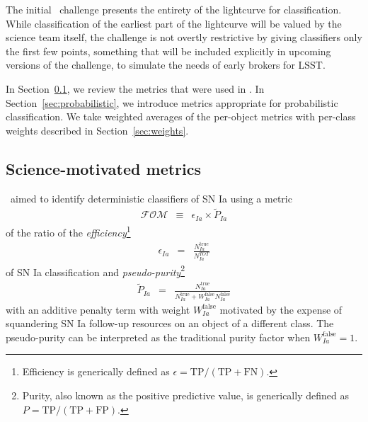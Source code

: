 The initial \plasticc\ challenge presents the entirety of the lightcurve for classification. While classification of the earliest part of the lightcurve will be valued by the science team itself, the challenge is not overtly restrictive by giving classifiers only the first few points, something that will be included explicitly in upcoming versions of the challenge, to simulate the needs of early brokers for LSST.


In Section~\ref{sec:science}, we review the metrics that were used in \snphotcc.
In Section~\ref{sec:probabilistic}, we introduce metrics appropriate for probabilistic classification.
We take weighted averages of the per-object metrics with per-class weights described in Section~\ref{sec:weights}.

\subsection{Science-motivated metrics}
\label{sec:science}


\snphotcc\ aimed to identify deterministic classifiers of SN Ia using a metric
\begin{eqnarray}
  \label{eq:snphotccfom}
  \mathcal{FOM} &\equiv& \epsilon_{Ia} \times \tilde{P}_{Ia}
\end{eqnarray}
of the ratio of the \textit{efficiency}\footnote{Efficiency is generically defined as $\epsilon = \mathrm{TP} / (\mathrm{TP} + \mathrm{FN})$.}
\begin{eqnarray}
  \label{eq:efficiency}
  \epsilon_{Ia} &=& \frac{N_{Ia}^{\mathrm{true}}}{N_{Ia}^{TOT}}
\end{eqnarray}
of SN Ia classification and \textit{pseudo-purity}\footnote{Purity, also known as the positive predictive value, is generically defined as $P = \mathrm{TP} / (\mathrm{TP} + \mathrm{FP})$.}
\begin{eqnarray}
  \label{eq:pseudopurity}
  \tilde{P}_{Ia} &=& \frac{N_{Ia}^{\mathrm{true}}}{N_{Ia}^\mathrm{true} + W_{Ia}^\mathrm{false}N_{Ia}^\mathrm{false}}
\end{eqnarray}
with an additive penalty term with weight $W_{Ia}^\mathrm{false}$ motivated by the expense of squandering SN Ia follow-up resources on an object of a different class.
The pseudo-purity can be interpreted as the traditional purity factor when $W_{Ia}^\mathrm{false} = 1$.

